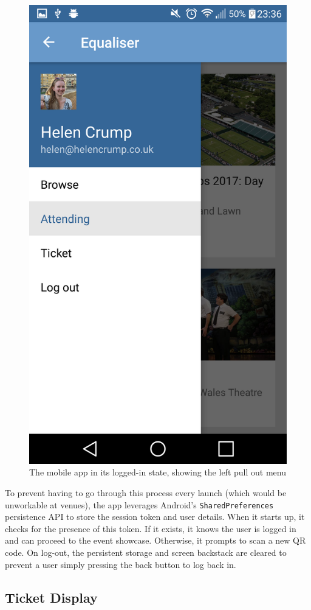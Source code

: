 \documentclass[12pt,a4paper]{bhamdissertation}
\newcommand{\code}[1]{\texttt{#1}}
\begin{document}
\begin{figure}[!htbp]
    \centering
    \includegraphics[width=.5\linewidth]{img/app_left_menu.png}
    \caption{The mobile app in its logged-in state, showing the left pull out menu}
    \label{fig:app_left_menu}
\end{figure}

To prevent having to go through this process every launch (which would be unworkable at venues), the app leverages Android's \code{SharedPreferences} persistence API to store the session token and user details. When it starts up, it checks for the presence of this token. If it exists, it knows the user is logged in and can proceed to the event showcase. Otherwise, it prompts to scan a new QR code. On log-out, the persistent storage and screen backstack are cleared to prevent a user simply pressing the back button to log back in.

\subsection{Ticket Display}
\end{document}
